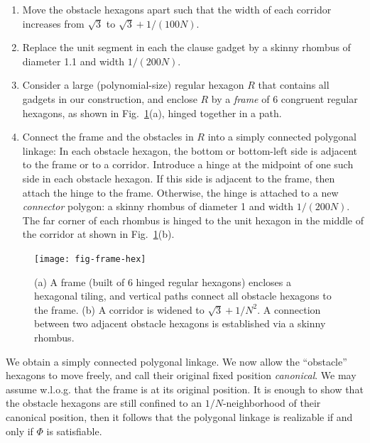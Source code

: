 \documentclass[runningheads]{article}
\begin{document}
\begin{enumerate}
\item Move the obstacle hexagons apart such that the width of each corridor increases from $\sqrt{3}$ to $\sqrt{3}+1/(100N)$.
\item Replace the unit segment in each the clause gadget by a skinny rhombus of diameter 1.1 and width $1/(200N)$.
\item Consider a large (polynomial-size) regular hexagon $R$ that contains all gadgets in our construction, and enclose $R$ by a \emph{frame} of 6 congruent regular hexagons, as shown in Fig.~\ref{fig:frame}(a), hinged together in a path.
\item Connect the frame and the obstacles in $R$ into a simply connected polygonal linkage: In each obstacle hexagon, the bottom or bottom-left side is adjacent to the frame or to a corridor. Introduce a hinge at the midpoint of one such side in each obstacle hexagon. If this side is adjacent to the frame, then attach the hinge to the frame. Otherwise, the hinge is attached to a new \emph{connector} polygon: a skinny rhombus of diameter 1 and width $1/(200N)$. The far corner of each rhombus is hinged to the unit hexagon in the middle of the corridor at shown in Fig.~\ref{fig:frame}(b).
\end{enumerate}

\begin{figure}[htbp]
	\centering
	\texttt{[image: fig-frame-hex]}
	\caption{(a) A frame (built of 6 hinged regular hexagons) encloses a hexagonal tiling, and
    vertical paths connect all obstacle hexagons to the frame.
    (b) A corridor is widened to $\sqrt{3}+1/N^2$. A connection between
    two adjacent obstacle hexagons is established via a skinny rhombus.}
	\label{fig:frame}
\end{figure}

We obtain a simply connected polygonal linkage. We now allow the ``obstacle'' hexagons
to move freely, and call their original fixed position \emph{canonical}. We may assume
w.l.o.g. that the frame is at its original position. It is enough to show that the obstacle
hexagons are still confined to an $1/N$-neighborhood of their canonical position, then it
follows that the polygonal linkage is realizable if and only if $\Phi$ is satisfiable.
\end{document}
